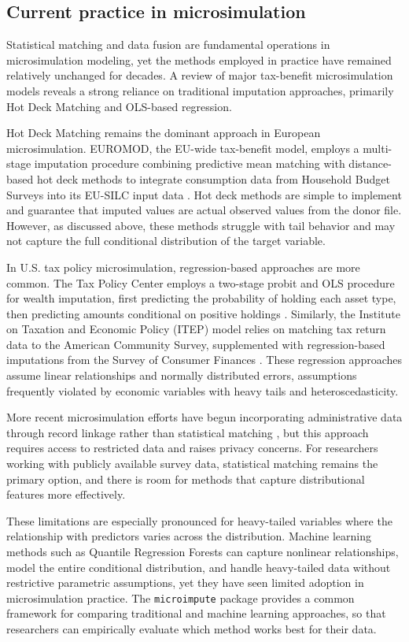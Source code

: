 \subsection{Current practice in microsimulation}

Statistical matching and data fusion are fundamental operations in microsimulation modeling, yet the methods employed in practice have remained relatively unchanged for decades. A review of major tax-benefit microsimulation models reveals a strong reliance on traditional imputation approaches, primarily Hot Deck Matching and OLS-based regression.

Hot Deck Matching remains the dominant approach in European microsimulation. EUROMOD, the EU-wide tax-benefit model, employs a multi-stage imputation procedure combining predictive mean matching with distance-based hot deck methods to integrate consumption data from Household Budget Surveys into its EU-SILC input data \citep{sutherland2013euromod}. Hot deck methods are simple to implement and guarantee that imputed values are actual observed values from the donor file. However, as discussed above, these methods struggle with tail behavior and may not capture the full conditional distribution of the target variable.

In U.S. tax policy microsimulation, regression-based approaches are more common. The Tax Policy Center employs a two-stage probit and OLS procedure for wealth imputation, first predicting the probability of holding each asset type, then predicting amounts conditional on positive holdings \citep{nunns2012tax}. Similarly, the Institute on Taxation and Economic Policy (ITEP) model relies on matching tax return data to the American Community Survey, supplemented with regression-based imputations from the Survey of Consumer Finances \citep{itep2023model}. These regression approaches assume linear relationships and normally distributed errors, assumptions frequently violated by economic variables with heavy tails and heteroscedasticity.

More recent microsimulation efforts have begun incorporating administrative data through record linkage rather than statistical matching \citep{abowd2019census}, but this approach requires access to restricted data and raises privacy concerns. For researchers working with publicly available survey data, statistical matching remains the primary option, and there is room for methods that capture distributional features more effectively.

These limitations are especially pronounced for heavy-tailed variables where the relationship with predictors varies across the distribution. Machine learning methods such as Quantile Regression Forests can capture nonlinear relationships, model the entire conditional distribution, and handle heavy-tailed data without restrictive parametric assumptions, yet they have seen limited adoption in microsimulation practice. The \texttt{microimpute} package provides a common framework for comparing traditional and machine learning approaches, so that researchers can empirically evaluate which method works best for their data.

